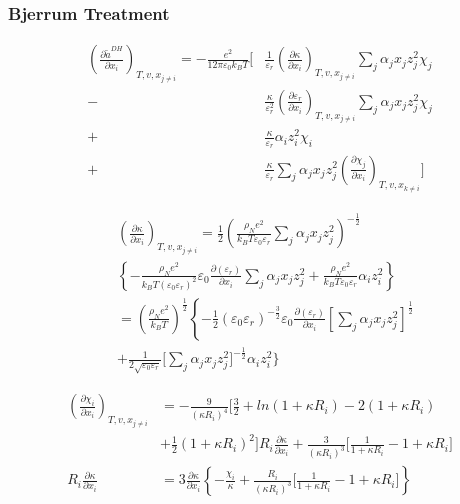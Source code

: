 \documentclass[12pt, letterpaper]{article}
\begin{document}
\subsubsection{Bjerrum Treatment}

\begin{equation}
\begin{aligned}
\left(\frac{\partial \tilde{a}^{DH}}{\partial x_{i}}\right)_{T,v,x_{j\neq i}}
=
-\frac{e^{2}}{12\pi\varepsilon_{0}k_{B}T}
\Bigg[
&\frac{1}{\varepsilon_{r}}\left(\frac{\partial\kappa}{\partial x_{i}}\right)_{T,v,x_{j\neq i}}
\sum_{j}\alpha_{j}x_{j}z_{j}^{2}\chi_{j}
\\
-&\frac{\kappa}{\varepsilon_{r}^{2}}
\left(\frac{\partial\varepsilon_{r}}{\partial x_{i}}\right)_{T,v,x_{j\neq i}}
\sum_{j}\alpha_{j}x_{j}z_{j}^{2}\chi_{j}
\\
+&\frac{\kappa}{\varepsilon_{r}}\alpha_{i}z_{i}^{2}\chi_{i}
\\
+&\frac{\kappa}{\varepsilon_{r}}
\sum_{j}\alpha_{j}x_{j}z_{j}^{2}
\left(\frac{\partial\chi_{j}}{\partial x_{i}}\right)_{T,v,x_{k\neq i}}
\Bigg]
\end{aligned}
\end{equation}


\begin{equation}
\begin{aligned}
&\left(\frac{\partial\kappa}{\partial x_{i}}\right)_{T,v,x_{j\neq i}}=\frac12\left(\frac{\rho_{N}e^{2}}{k_{B}T\varepsilon_{0}\varepsilon_{r}}\sum_{j}\alpha_{j}x_{j}z_{j}^{2}\right)^{-\frac12}\\&\left\{-\frac{\rho_Ne^2}{k_BT\left(\varepsilon_0\varepsilon_r\right)^2}\varepsilon_0\frac{\partial\left(\varepsilon_r\right)}{\partial x_i}\sum_j\alpha_{j}x_jz_j^2+\frac{\rho_Ne^2}{k_BT\varepsilon_0\varepsilon_r}\alpha_iz_i^2\right\}\\&=\left(\frac{\rho_{N}e^{2}}{k_{B}T}\right)^{\frac{1}{2}}\left\{-\frac{1}{2}\left(\varepsilon_{0}\varepsilon_{r}\right)^{-\frac{3}{2}}\varepsilon_{0}\frac{\partial\left(\varepsilon_{r}\right)}{\partial x_{i}}\left[\sum_{j}\alpha_{j}x_{j}z_{j}^{2}\right]^{\frac{1}{2}}\right.\\&+\frac{1}{2\sqrt{\varepsilon_0\varepsilon_r}}\Bigg[\sum_j\alpha_{j}x_jz_j^2\Bigg]^{-\frac{1}{2}}\alpha_iz_i^2\Bigg\}
\end{aligned}
\end{equation}

\begin{equation}
\begin{aligned}
\left(\frac{\partial\chi_{i}}{\partial x_{i}}\right)_{T,v,x_{j\neq i}}&=-\frac{9}{\left(\kappa R_{i}\right)^{4}}\biggl[\frac{3}{2}+ln(1+\kappa R_{i})-2(1+\kappa R_{i})\\&+\frac{1}{2}\left(1+\kappa R_{i}\right)^{2}\bigg]R_{i}\frac{\partial\kappa}{\partial x_{i}}+\frac{3}{\left(\kappa R_{i}\right)^{3}}\bigg[\frac{1}{1+\kappa R_{i}}-1+\kappa R_{i}\bigg]\\R_{i}\frac{\partial\kappa}{\partial x_{i}}&= 3\frac{\partial\kappa}{\partial x_{i}}\left\{-\frac{\chi_{i}}{\kappa}+\frac{R_{i}}{\left(\kappa R_{i}\right)^{3}}\biggl[\frac{1}{1+\kappa R_{i}}-1+\kappa R_{i}\biggr]\right\}
\end{aligned}
\end{equation}
\end{document}
